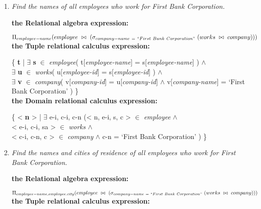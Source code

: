 \documentclass[paper=8.27in:11.69in, 14pt, DIV=calc]{scrartcl}
\begin{document}
\begin{enumerate}[label=\alph*)]

\item \textit{Find the names of all employees who work for First Bank Corporation.\\}

\textbf{the Relational algebra expression:\\}

$\Pi_{employee-name}(employee \ \bowtie \ (\sigma_{company-name \ = \ ``First \ Bank \ Corporation"} \ (works \ \bowtie \ company)))$\\

\textbf{the Tuple relational calculus expression:\\}

\{ \textbf{t} | $\exists$ \textbf{s} $\in$ \textit{employee}( t[\textit{employee-name}] = s[\textit{employee-name}] ) $\wedge$ \\ $\exists$ \textbf{u} $\in$ \textit{works}( u[\textit{employee-id}] = s[\textit{employee-id}] ) $\wedge$ \\ $\exists$ \textbf{v} $\in$ \textit{company}( v[\textit{company-id}] = u[\textit{company-id}] $\wedge$ v[\textit{company-name}] = `First Bank Corporation' ) \}\\

\textbf{the Domain relational calculus expression:\\}

\{ < \textbf{n} > | $\exists$ e-i, c-i, c-n (< n, e-i, s, c > $\in$ \textit{employee} $\wedge$ \\ < e-i, c-i, sa > $\in$ \textit{works} $\wedge$ \\ < c-i, c-n, c > $\in$ \textit{company} $\wedge$ c-n = `First Bank Corporation' ) \}\\

\newpage

\item \textit{Find the names and cities of residence of all employees who work for First Bank Corporation.\\}

\textbf{the Relational algebra expression:\\}

$\Pi_{employee-name, employee.city}(employee \ \bowtie \ (\sigma_{company-name \ = \ ``First \ Bank \ Corporation"} \ (works \ \bowtie \ company)))$\\

\textbf{the Tuple relational calculus expression:\\}


\end{enumerate}
\end{document}
